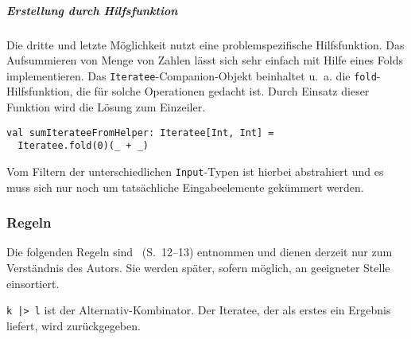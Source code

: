 \documentclass[draft=false
              ,paper=a4
              ,twoside=false
              ,fontsize=11pt
              ,headsepline
              ,BCOR10mm
              ,DIV11
              ]{scrbook}
\begin{document}
\subparagraph{Erstellung durch Hilfsfunktion} %
\label{subp:erstellung_durch_hilfsfunktion}\mbox{} %

Die dritte und letzte Möglichkeit nutzt eine problemspezifische Hilfsfunktion.
Das Aufsummieren von Menge von Zahlen lässt sich sehr einfach mit Hilfe eines Folds implementieren.
Das \lstinline|Iteratee|-Companion-Objekt beinhaltet u.~a. die \lstinline|fold|-Hilfsfunktion, die für solche Operationen gedacht ist.
Durch Einsatz dieser Funktion wird die Lösung zum Einzeiler.

\begin{lstlisting}
val sumIterateeFromHelper: Iteratee[Int, Int] =
  Iteratee.fold(0)(_ + _)
\end{lstlisting}

Vom Filtern der unterschiedlichen \lstinline|Input|-Typen ist hierbei abstrahiert und es muss sich nur noch um tatsächliche Eingabeelemente gekümmert werden.





\subsubsection{Regeln} %
\label{ssub:regeln}

Die folgenden Regeln sind \citealt{kiselyov2012}~(S.~12--13) entnommen und dienen derzeit nur zum Verständnis des Autors.
Sie werden später, sofern möglich, an geeigneter Stelle einsortiert.

\lstinline!k |> l! ist der Alternativ-Kombinator. Der Iteratee, der als erstes ein Ergebnis liefert, wird zurückgegeben.
\end{document}
